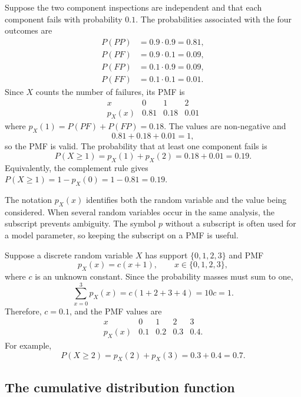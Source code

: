 \begin{example}\par
Suppose the two component inspections are independent and that each component fails with probability $0.1$. The probabilities associated with the four outcomes are
\[
\begin{aligned}
P(PP)&=0.9\cdot0.9=0.81,\\
P(PF)&=0.9\cdot0.1=0.09,\\
P(FP)&=0.1\cdot0.9=0.09,\\
P(FF)&=0.1\cdot0.1=0.01.
\end{aligned}
\]
Since $X$ counts the number of failures, its PMF is
\[
\begin{array}{c|ccc}
x & 0 & 1 & 2\\ \hline
p_X(x) & 0.81 & 0.18 & 0.01
\end{array}
\]
where $p_X(1)=P(PF)+P(FP)=0.18$. The values are non-negative and
\[
0.81+0.18+0.01=1,
\]
so the PMF is valid. The probability that at least one component fails is
\[
P(X\geq1)=p_X(1)+p_X(2)=0.18+0.01=0.19.
\]
Equivalently, the complement rule gives $P(X\geq1)=1-p_X(0)=1-0.81=0.19$.
\end{example}

The notation $p_X(x)$ identifies both the random variable and the value being considered. When several random variables occur in the same analysis, the subscript prevents ambiguity. The symbol $p$ without a subscript is often used for a model parameter, so keeping the subscript on a PMF is useful.

\begin{example}\par
Suppose a discrete random variable $X$ has support $\{0,1,2,3\}$ and PMF
\[
p_X(x)=c(x+1),\qquad x\in\{0,1,2,3\},
\]
where $c$ is an unknown constant. Since the probability masses must sum to one,
\[
\sum_{x=0}^{3}p_X(x)
=c(1+2+3+4)
=10c
=1.
\]
Therefore, $c=0.1$, and the PMF values are
\[
\begin{array}{c|cccc}
x & 0 & 1 & 2 & 3\\ \hline
p_X(x) & 0.1 & 0.2 & 0.3 & 0.4.
\end{array}
\]
For example,
\[
P(X\geq2)=p_X(2)+p_X(3)=0.3+0.4=0.7.
\]
\end{example}

\subsection{The cumulative distribution function}

